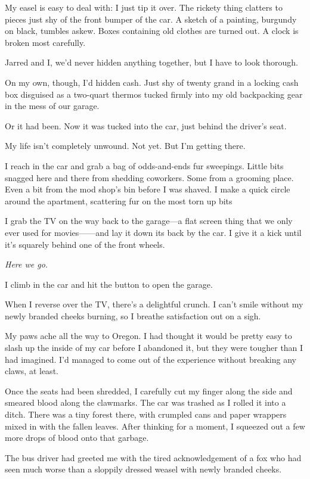 My easel is easy to deal with: I just tip it over. The rickety thing clatters to pieces just shy of the front bumper of the car. A sketch of a painting, burgundy on black, tumbles askew. Boxes containing old clothes are turned out. A clock is broken most carefully.

Jarred and I, we'd never hidden anything together, but I have to look thorough.

On my own, though, I'd hidden cash. Just shy of twenty grand in a locking cash box disguised as a two-quart thermos tucked firmly into my old backpacking gear in the mess of our garage.

Or it had been. Now it was tucked into the car, just behind the driver's seat.

My life isn't completely unwound. Not yet. But I'm getting there.

I reach in the car and grab a bag of odds-and-ends fur sweepings. Little bits snagged here and there from shedding coworkers. Some from a grooming place. Even a bit from the mod shop's bin before I was shaved. I make a quick circle around the apartment, scattering fur on the most torn up bits

I grab the TV on the way back to the garage---a flat screen thing that we only ever used for movies------and lay it down its back by the car. I give it a kick until it's squarely behind one of the front wheels.

\emph{Here we go.}

I climb in the car and hit the button to open the garage.

When I reverse over the TV, there's a delightful crunch. I can't smile without my newly branded cheeks burning, so I breathe satisfaction out on a sigh.

\secdiv{}

\noindent My paws ache all the way to Oregon. I had thought it would be pretty easy to slash up the inside of my car before I abandoned it, but they were tougher than I had imagined. I'd managed to come out of the experience without breaking any claws, at least.

Once the seats had been shredded, I carefully cut my finger along the side and smeared blood along the clawmarks. The car was trashed as I rolled it into a ditch. There was a tiny forest there, with crumpled cans and paper wrappers mixed in with the fallen leaves. After thinking for a moment, I squeezed out a few more drops of blood onto that garbage.

The bus driver had greeted me with the tired acknowledgement of a fox who had seen much worse than a sloppily dressed weasel with newly branded cheeks.

